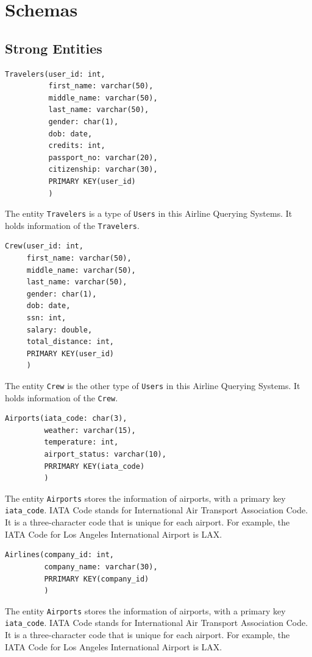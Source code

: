 \documentclass{article}
\begin{document}
	\section{Schemas}
	
	\subsection{Strong Entities}
	\begin{lstlisting}[keepspaces=true]
Travelers(user_id: int,
          first_name: varchar(50),
          middle_name: varchar(50),
          last_name: varchar(50),
          gender: char(1),
          dob: date,
          credits: int,
          passport_no: varchar(20), 
          citizenship: varchar(30),
          PRIMARY KEY(user_id)
          )
	\end{lstlisting}    
	The entity \texttt{Travelers} is a type of \texttt{Users} in this Airline Querying Systems. It holds information of the \texttt{Travelers}.
	
	\begin{lstlisting}[keepspaces=true]
Crew(user_id: int,
     first_name: varchar(50),
     middle_name: varchar(50),
     last_name: varchar(50),
     gender: char(1),
     dob: date,
     ssn: int, 
     salary: double, 
     total_distance: int,
     PRIMARY KEY(user_id)
     )
	\end{lstlisting}    
	The entity \texttt{Crew} is the other type of \texttt{Users} in this Airline Querying Systems. It holds information of the \texttt{Crew}.
	
	\begin{lstlisting}[keepspaces=true]
Airports(iata_code: char(3), 
         weather: varchar(15),
         temperature: int,
         airport_status: varchar(10),
         PRRIMARY KEY(iata_code)
         )
	\end{lstlisting}    
	The entity \texttt{Airports} stores the information of airports, with a primary key \texttt{iata\_code}. IATA Code stands for International Air Transport Association Code. It is a three-character code that is unique for each airport. For example, the IATA Code for Los Angeles International Airport is LAX.
	
	\begin{lstlisting}[keepspaces=true]             
Airlines(company_id: int,
         company_name: varchar(30),
         PRRIMARY KEY(company_id)
         )
	\end{lstlisting}    
	The entity \texttt{Airports} stores the information of airports, with a primary key \texttt{iata\_code}. IATA Code stands for International Air Transport Association Code. It is a three-character code that is unique for each airport. For example, the IATA Code for Los Angeles International Airport is LAX.
	
\end{document}
